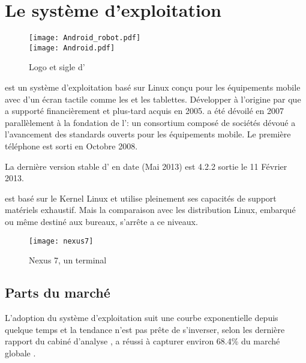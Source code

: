 \section{Le système d'exploitation \android{}}

\begin{figure}[H]
\begin{center}
\texttt{[image: Android\_robot.pdf]}\\
\texttt{[image: Android.pdf]}
\end{center}
\caption{Logo et sigle d'\android{}}
\end{figure}

\android{} est un système d'exploitation basé sur Linux conçu pour les
équipements mobile avec d'un écran tactile comme les  et
les tablettes. Développer à l'origine par  que
 a supporté financièrement et plus-tard acquis en 2005.
\android{} a été dévoilé en 2007 parallèlement à la fondation de
l': un consortium composé de sociétés dévoué a
l'avancement des standards ouverts pour les équipements mobile. Le
première téléphone  \android{} est sorti en Octobre 2008.

La dernière version stable d'\android{} en date (Mai 2013) est 4.2.2
 sortie le 11 Février 2013.

\android{} est basé sur le Kernel Linux et utilise pleinement ses capacités de support matériels exhaustif. Mais la comparaison avec les distribution Linux, embarqué ou même destiné aux bureaux, s'arrête a ce niveaux.~\cite{lft:growth_android}

\begin{figure}
\centering
\texttt{[image: nexus7]}
\caption{ Nexus 7, un terminal \android}
\end{figure}

\subsection{Parts du marché}

L’adoption du système d'exploitation \android{} suit une courbe
exponentielle depuis quelque temps et la tendance n'est pas prête de
s’inverser, selon les dernière rapport du cabiné d'analyse , \android{} a réussi à capturer environ 68.4\% du marché
globale \cite{venturebeat.com}.

